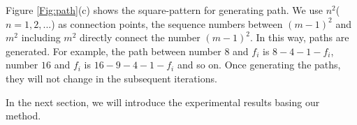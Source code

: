  Figure \ref{Fig:path}(c) shows the square-pattern for generating path.
 We use $n^2$($ n = 1, 2,...$) as connection points, the sequence numbers between $(m-1)^2$ and $m^2$ including $m^2$ directly connect the number $(m-1)^2$.
 In this way, paths are generated.
 For example, the path between number $8$ and $f_i$ is $8-4-1-f_i$, number $16$ and $f_i$ is $16-9-4-1-f_i$ and so on.
 Once generating the paths, they will not change in the subsequent iterations.

 In the next section, we will introduce the experimental results basing our method.

